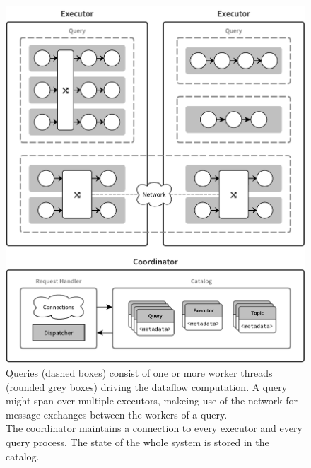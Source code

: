 \begin{figure}[p]
  \centering
    \includegraphics[width=1\textwidth]{figures/components}
  \caption[System architecture.]{ Queries (dashed boxes) consist of one or
  more worker threads (rounded grey boxes) driving the dataflow computation.
  A query might span over multiple executors, makeing use of the network for message exchanges
  between the workers of a query.\\
  The coordinator maintains a connection to every  executor and every query process.
  The state of the whole system is stored in the catalog.}
  \label{fig:components}
\end{figure}

